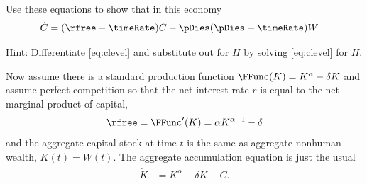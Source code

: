 \item Use these equations to show that in this economy
\begin{equation}\begin{gathered}\begin{aligned}
        \dot{C} & =  (\rfree-\timeRate) C - \pDies(\pDies+\timeRate) W \label{eq:aggCdot}
\end{aligned}\end{gathered}\end{equation}

Hint: Differentiate \eqref{eq:clevel} and substitute out for $H$ by solving
\eqref{eq:clevel} for $H$.


Now assume there is a standard production function
$\FFunc(K)=K^{\alpha}-\delta K$ and assume perfect competition so that the
net interest rate $r$ is equal to the net marginal product of capital,
\begin{equation}
        \rfree = \FFunc^{\prime}(K) = \alpha K^{\alpha-1}-\delta
\end{equation}
and the aggregate capital stock at time $t$ is the same as aggregate
nonhuman wealth, $K(t)=W(t)$.  The aggregate accumulation equation is
just the usual
\begin{equation}\begin{gathered}\begin{aligned}
  \dot{K} & =  K^{\alpha}-\delta K -C. \label{eq:aggkdot}
\end{aligned}\end{gathered}\end{equation}

